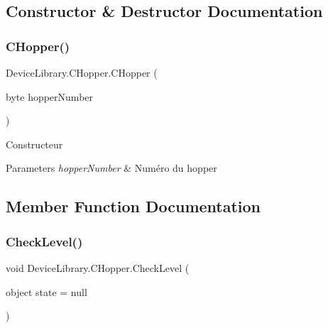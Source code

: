 \subsection{Constructor \& Destructor Documentation}
\mbox{\label{class_device_library_1_1_c_hopper_a25c0ba824eb783ecdec6c6f53f90f243}} 
\subsubsection{\texorpdfstring{C\+Hopper()}{CHopper()}}
{\footnotesize\ttfamily Device\+Library.\+C\+Hopper.\+C\+Hopper (\begin{DoxyParamCaption}\item[{byte}]{hopper\+Number }\end{DoxyParamCaption})\hspace{0.3cm}{\ttfamily [inline]}}



Constructeur 


\begin{DoxyParams}{Parameters}
{\em hopper\+Number} & Numéro du hopper\\
\hline
\end{DoxyParams}


\subsection{Member Function Documentation}
\mbox{\label{class_device_library_1_1_c_hopper_aa46a9adf83ee5e25c9d6c6f3e315501a}} 
\subsubsection{\texorpdfstring{Check\+Level()}{CheckLevel()}}
{\footnotesize\ttfamily void Device\+Library.\+C\+Hopper.\+Check\+Level (\begin{DoxyParamCaption}\item[{object}]{state = {\ttfamily null} }\end{DoxyParamCaption})\hspace{0.3cm}{\ttfamily [inline]}}



